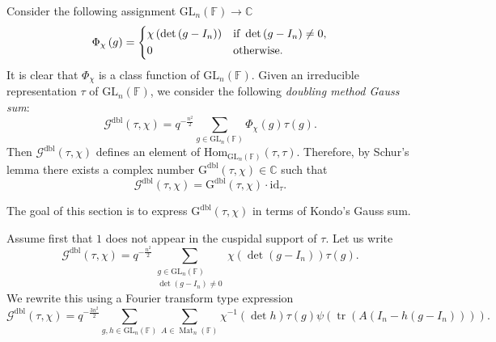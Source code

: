 \documentclass[12pt, reqno]{amsart}
\theoremstyle{definition}
\theoremstyle{definition}
\theoremstyle{definition}
\newcommand{\cComplex}{\mathbb{C}}
\newcommand{\Hom}{\mathrm{Hom}}
\newcommand{\idmap}{\mathrm{id}}
\newcommand{\fieldCharacter}{\psi}
\newcommand{\IdentityMatrix}[1]{I_{#1}}
\newcommand{\trace}{\operatorname{tr}}
\newcommand{\GL}{\mathrm{GL}}
\newcommand{\finiteField}{\mathbb{F}}
\newcommand{\squareMatrix}{\operatorname{Mat}}
\newcommand{\dblGaussSum}[2]{\mathcal{G}^{\mathrm{dbl}}\left(#1, #2\right)}
\newcommand{\dblGaussSumScalar}[2]{\mathrm{G}^{\mathrm{dbl}}\left(#1, #2\right)}
\begin{document}
Consider the following assignment $\GL_n\left(\finiteField\right) \to \cComplex$
$$\Phi_{\chi}\left(g\right) = \begin{dcases}
	\chi\left(\det\left(g-\IdentityMatrix{n}\right)\right) & \text{if }\det\left(g-\IdentityMatrix{n}\right) \ne 0,\\
	0 & \text{otherwise.}
\end{dcases}$$
It is clear that $\Phi_{\chi}$ is a class function of $\GL_n\left(\finiteField\right)$. Given an irreducible representation $\tau$ of $\GL_n\left(\finiteField\right)$, we consider the following \emph{doubling method Gauss sum}:
$$\dblGaussSum{\tau}{\chi} = q^{-\frac{n^2}{2}} \sum_{g \in \GL_n\left(\finiteField\right)} \Phi_{\chi}\left(g\right) \tau\left(g\right).$$
Then $\dblGaussSum{\tau}{\chi}$ defines an element of $\Hom_{\GL_n\left(\finiteField\right)}\left(\tau, \tau\right)$. Therefore, by Schur's lemma there exists a complex number $\dblGaussSumScalar{\tau}{\chi} \in \cComplex$ such that $$\dblGaussSum{\tau}{\chi} = \dblGaussSumScalar{\tau}{\chi} \cdot \idmap_\tau.$$ 

The goal of this section is to express $\dblGaussSumScalar{\tau}{\chi}$ in terms of Kondo's Gauss sum.

Assume first that $1$ does not appear in the cuspidal support of $\tau$. Let us write
$$\dblGaussSum{\tau}{\chi} = q^{-\frac{n^2}{2}} \sum_{\substack{g \in \GL_n\left(\finiteField\right) \\
		\det\left(g - \IdentityMatrix{n}\right) \ne 0}} \chi\left(\det\left(g - \IdentityMatrix{n}\right)\right) \tau\left(g\right).$$
We rewrite this using a Fourier transform type expression
$$\dblGaussSum{\tau}{\chi} = q^{-\frac{3n^2}{2}} \sum_{g, h \in \GL_n\left(\finiteField\right)} \sum_{A \in \squareMatrix_n\left(\finiteField\right)} \chi^{-1}\left(\det h\right) \tau\left(g\right) \fieldCharacter\left(\trace\left(A \left(\IdentityMatrix{n} - h \left(g - \IdentityMatrix{n}\right)\right)\right)\right).$$
\end{document}
